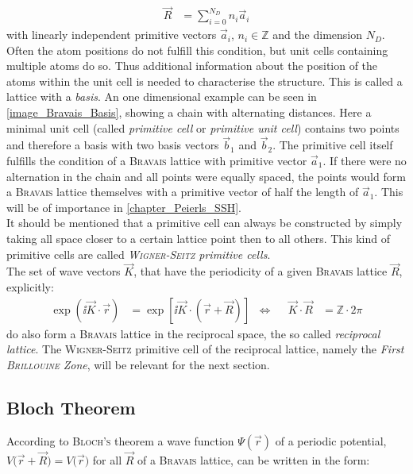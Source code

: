 \begin{align}
	\vec{R} &= \sum_{i = 0}^{N_D} n_i \vec{a}_i
\end{align}
with linearly independent primitive vectors $\vec{a}_i$, $n_i \in \mathbb{Z}$ and the dimension $N_D$.\\ Often the atom positions do not fulfill this condition, but unit cells containing multiple atoms do so. Thus additional information about the position of the atoms within the unit cell is needed to characterise the structure. This is called a lattice with a \emph{basis}. An one dimensional example can be seen in \cref{image_Bravais_Basis}, showing a chain with alternating distances. Here a minimal unit cell (called \emph{primitive cell} or \emph{primitive unit cell}) contains two points and therefore a basis with two basis vectors $\vec{b}_1$ and $\vec{b}_2$. The primitive cell itself fulfills the condition of a \textsc{Bravais} lattice with primitive vector $\vec{a}_1$. If there were no alternation in the chain and all points were equally spaced, the points would form a \textsc{Bravais} lattice themselves with a primitive vector of half the length of $\vec{a}_1$. This will be of importance in \cref{chapter_Peierls_SSH}.\\
It should be mentioned that a primitive cell can always be constructed by simply taking all space closer to a certain lattice point then to all others. This kind of primitive cells are called \emph{\textsc{Wigner-Seitz} primitive cells}.\\
The set of wave vectors $\vec{K}$, that have the periodicity of a given \textsc{Bravais} lattice $\vec{R}$, explicitly:
\begin{align}
\exp\left(\ii\vec{K}\cdot\vec{r}\right) &= \exp\left[\ii\vec{K}\cdot\left(\vec{r} + \vec{R}\right)\right] &\Leftrightarrow& &\vec{K}\cdot\vec{R} &= \mathbb{Z}\cdot 2\pi	
\end{align}
do also form a \textsc{Bravais} lattice in the reciprocal space, the so called \emph{reciprocal lattice}. The \textsc{Wigner-Seitz} primitive cell of the reciprocal lattice, namely the \emph{First \textsc{Brillouine} Zone}, will be relevant for the next section.

\subsection{Bloch Theorem}
\label{section_bloch}
According to \textsc{Bloch's} theorem a wave function $\Psi(\vec{r})$ of a periodic potential, $V\big(\vec{r} + \vec{R}\big)= V\big(\vec{r}\big)$ for all $\vec{R}$ of a \textsc{Bravais} lattice, can be written in the form:

